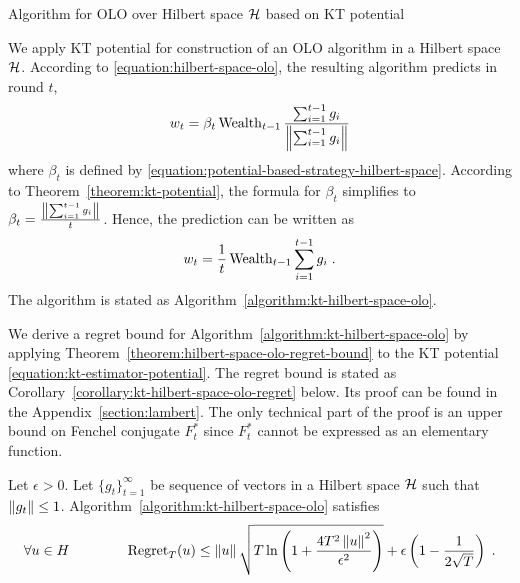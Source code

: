 \begin{algorithm}[t]
\caption{Algorithm for OLO over Hilbert space $\mathcal{H}$ based on KT potential
\label{algorithm:kt-hilbert-space-olo}}
\begin{algorithmic}
{
\ENDFOR
}
\end{algorithmic}
\end{algorithm}

We apply KT potential for construction of an OLO algorithm in a Hilbert
space $\mathcal{H}$. According to \eqref{equation:hilbert-space-olo}, the resulting algorithm predicts
in round $t$,
$$
w_t = \beta_t \operatorname{Wealth}_{t-1} \frac{\sum_{i=1}^{t-1} g_i}{\left\|{\sum_{i=1}^{t-1} g_i}\right\|}
$$
where $\beta_t$ is defined by
\eqref{equation:potential-based-strategy-hilbert-space}. According to
Theorem~\ref{theorem:kt-potential}, the formula for $\beta_t$ simplifies to
$\beta_t = \frac{\left\|{\sum_{i=1}^{t-1} g_i}\right\|}{t}$. Hence, the prediction can be
written as
$$
w_t = \frac{1}{t} \operatorname{Wealth}_{t-1} \sum_{i=1}^{t-1} g_i \; .
$$
The algorithm is stated as Algorithm~\ref{algorithm:kt-hilbert-space-olo}.

We derive a regret bound for Algorithm~\ref{algorithm:kt-hilbert-space-olo} by
applying Theorem~\ref{theorem:hilbert-space-olo-regret-bound} to the KT
potential \eqref{equation:kt-estimator-potential}. The regret bound is stated as
Corollary~\ref{corollary:kt-hilbert-space-olo-regret} below. Its proof can be
found in the Appendix~\ref{section:lambert}. The only technical part of the
proof is an upper bound on Fenchel conjugate $F_t^*$ since $F_t^*$ cannot be
expressed as an elementary function.

\begin{corollary}
\label{corollary:kt-hilbert-space-olo-regret}
Let $\epsilon > 0$. Let $\{g_t\}_{t=1}^\infty$ be sequence of vectors in a
Hilbert space $\mathcal{H}$ such that $\left\|{g_t}\right\| \le 1$.
Algorithm~\ref{algorithm:kt-hilbert-space-olo} satisfies
$$
\forall u \in H \qquad \qquad
\operatorname{Regret}_T(u) \le \left\|{u}\right\| \sqrt{T \ln\left(1 + \frac{4T^2 \left\|{u}\right\|^2}{\epsilon^2} \right)} + \epsilon \left(1 - \frac{1}{2\sqrt{T}} \right) \;.
$$
\end{corollary}


